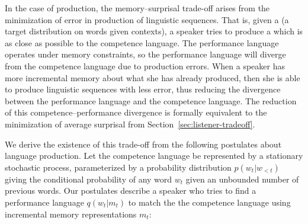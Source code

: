 In the case of production, the memory--surprisal trade-off arises from the minimization of error in production of linguistic sequences. That is, given a  (a target distribution on words given contexts), a speaker tries to produce a  which is as close as possible to the competence language. The performance language operates under memory constraints, so the performance language will diverge from the competence language due to production errors. When a speaker has more incremental memory about what she has already produced, then she is able to produce linguistic sequences with less error, thus reducing the divergence between the performance language and the competence language. The reduction of this competence--performance divergence is formally equivalent to the minimization of average surprisal from Section~\ref{sec:listener-tradeoff}.


We derive the existence of this trade-off from the following postulates about language production. Let the competence language be represented by a stationary stochastic process, parameterized by a probability distribution $p(w_t | w_{<t})$ giving the conditional probability of any word $w_t$ given an unbounded number of previous words. Our postulates describe a speaker who tries to find a performance language $q(w_t|m_t)$ to match the the competence language using incremental memory representations $m_t$:

